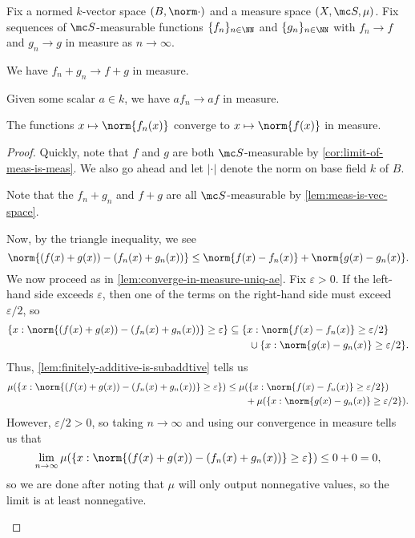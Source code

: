 \documentclass[../notes.tex]{subfiles}
\begin{document}
\begin{lemma} \label{lem:linear-combo-in-measure}
	Fix a normed $k$-vector space $(B,\norm\cdot)$ and a measure space $(X,\mc S,\mu)$. Fix sequences of $\mc S$-measurable functions $\{f_n\}_{n\in\NN}$ and $\{g_n\}_{n\in\NN}$ with $f_n\to f$ and $g_n\to g$ in measure as $n\to\infty$.
	\begin{listalph}
		\item We have $f_n+g_n\to f+g$ in measure.
		\item Given some scalar $a\in k$, we have $af_n\to af$ in measure.
		\item The functions $x\mapsto\norm{f_n(x)}$ converge to $x\mapsto\norm{f(x)}$ in measure.
	\end{listalph}
\end{lemma}
\begin{proof}
	Quickly, note that $f$ and $g$ are both $\mc S$-measurable by \autoref{cor:limit-of-meas-is-meas}. We also go ahead and let $|\cdot|$ denote the norm on base field $k$ of $B$.
	\begin{listalph}
		\item Note that the $f_n+g_n$ and $f+g$ are all $\mc S$-measurable by \autoref{lem:meas-is-vec-space}.
		
		Now, by the triangle inequality, we see
		\[\norm{(f(x)+g(x))-(f_n(x)+g_n(x))}\le\norm{f(x)-f_n(x)}+\norm{g(x)-g_n(x)}.\]
		We now proceed as in \autoref{lem:converge-in-measure-uniq-ae}. Fix $\varepsilon>0$. If the left-hand side exceeds $\varepsilon$, then one of the terms on the right-hand side must exceed $\varepsilon/2$, so
		\begin{align*}
			\{x:\norm{(f(x)+g(x))-(f_n(x)+g_n(x))}\ge\varepsilon\}&\subseteq\{x:\norm{f(x)-f_n(x)}\ge\varepsilon/2\} \\
			&\qquad\cup\{x:\norm{g(x)-g_n(x)}\ge\varepsilon/2\}.
		\end{align*}
		Thus, \autoref{lem:finitely-additive-is-subaddtive} tells us
		\begin{align*}
			\mu(\{x:\norm{(f(x)+g(x))-(f_n(x)+g_n(x))}\ge\varepsilon\}) &\le \mu(\{x:\norm{f(x)-f_n(x)}\ge\varepsilon/2\}) \\
			&\qquad+\mu(\{x:\norm{g(x)-g_n(x)}\ge\varepsilon/2\}).
		\end{align*}
		However, $\varepsilon/2>0$, so taking $n\to\infty$ and using our convergence in measure tells us that
		\[\lim_{n\to\infty}\mu(\{x:\norm{(f(x)+g(x))-(f_n(x)+g_n(x))}\ge\varepsilon\})\le0+0=0,\]
		so we are done after noting that $\mu$ will only output nonnegative values, so the limit is at least nonnegative.


\end{listalph}
\end{proof}
\end{document}
